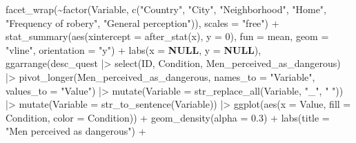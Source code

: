 \documentclass[
  bookmarksnumbered]{article}
\newenvironment{Shaded}{\begin{snugshade}}{\end{snugshade}}
\newcommand{\AttributeTok}[1]{\textcolor[rgb]{0.80,0.80,0.80}{#1}}
\newcommand{\ConstantTok}[1]{\textcolor[rgb]{0.86,0.64,0.64}{\textbf{#1}}}
\newcommand{\DecValTok}[1]{\textcolor[rgb]{0.86,0.86,0.80}{#1}}
\newcommand{\FloatTok}[1]{\textcolor[rgb]{0.75,0.75,0.82}{#1}}
\newcommand{\FunctionTok}[1]{\textcolor[rgb]{0.94,0.94,0.56}{#1}}
\newcommand{\NormalTok}[1]{\textcolor[rgb]{0.80,0.80,0.80}{#1}}
\newcommand{\SpecialCharTok}[1]{\textcolor[rgb]{0.86,0.64,0.64}{#1}}
\newcommand{\StringTok}[1]{\textcolor[rgb]{0.80,0.58,0.58}{#1}}
\begin{document}
\begin{Shaded}
\begin{Highlighting}[]
            \FunctionTok{facet\_wrap}\NormalTok{(}\SpecialCharTok{\textasciitilde{}}\FunctionTok{factor}\NormalTok{(Variable, }\FunctionTok{c}\NormalTok{(}\StringTok{"Country"}\NormalTok{, }\StringTok{"City"}\NormalTok{, }\StringTok{"Neighborhood"}\NormalTok{, }\StringTok{"Home"}\NormalTok{,}
                                           \StringTok{"Frequency of robery"}\NormalTok{, }\StringTok{"General perception"}\NormalTok{)),}
                       \AttributeTok{scales =} \StringTok{"free"}\NormalTok{) }\SpecialCharTok{+}
            \FunctionTok{stat\_summary}\NormalTok{(}\FunctionTok{aes}\NormalTok{(}\AttributeTok{xintercept =} \FunctionTok{after\_stat}\NormalTok{(x), }\AttributeTok{y =} \DecValTok{0}\NormalTok{),}
                         \AttributeTok{fun =}\NormalTok{ mean, }\AttributeTok{geom =} \StringTok{"vline"}\NormalTok{, }\AttributeTok{orientation =} \StringTok{"y"}\NormalTok{) }\SpecialCharTok{+}
            \FunctionTok{labs}\NormalTok{(}\AttributeTok{x =} \ConstantTok{NULL}\NormalTok{, }\AttributeTok{y =} \ConstantTok{NULL}\NormalTok{),}
          \FunctionTok{ggarrange}\NormalTok{(desc\_quest }\SpecialCharTok{|\textgreater{}}
                      \FunctionTok{select}\NormalTok{(ID, Condition, }
\NormalTok{                             Men\_perceived\_as\_dangerous) }\SpecialCharTok{|\textgreater{}} 
                      \FunctionTok{pivot\_longer}\NormalTok{(Men\_perceived\_as\_dangerous,}
                                   \AttributeTok{names\_to =} \StringTok{"Variable"}\NormalTok{,}
                                   \AttributeTok{values\_to =} \StringTok{"Value"}\NormalTok{) }\SpecialCharTok{|\textgreater{}} 
                      \FunctionTok{mutate}\NormalTok{(}\AttributeTok{Variable =} \FunctionTok{str\_replace\_all}\NormalTok{(Variable, }
                                                        \StringTok{"\_"}\NormalTok{, }\StringTok{" "}\NormalTok{)) }\SpecialCharTok{|\textgreater{}} 
                      \FunctionTok{mutate}\NormalTok{(}\AttributeTok{Variable =} \FunctionTok{str\_to\_sentence}\NormalTok{(Variable)) }\SpecialCharTok{|\textgreater{}} 
                      \FunctionTok{ggplot}\NormalTok{(}\FunctionTok{aes}\NormalTok{(}\AttributeTok{x =}\NormalTok{ Value, }\AttributeTok{fill =}\NormalTok{ Condition, }\AttributeTok{color =}\NormalTok{ Condition)) }\SpecialCharTok{+}
                      \FunctionTok{geom\_density}\NormalTok{(}\AttributeTok{alpha =} \FloatTok{0.3}\NormalTok{) }\SpecialCharTok{+}
                      \FunctionTok{labs}\NormalTok{(}\AttributeTok{title =} \StringTok{"Men perceived as dangerous"}\NormalTok{) }\SpecialCharTok{+}

\end{Highlighting}
\end{Shaded}
\end{document}
